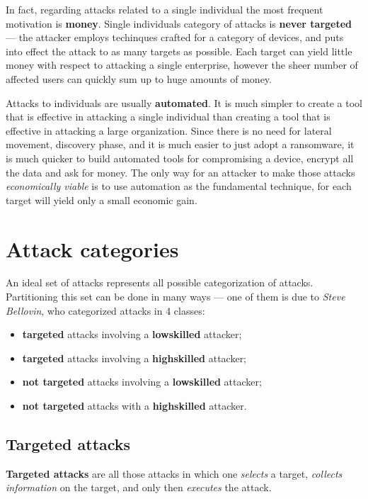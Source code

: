 \documentclass[10pt]{extreport}
\begin{document}
In fact, regarding attacks related to a single individual the most frequent
motivation is \textbf{money}. Single individuals category of attacks is
\textbf{never targeted} --- the attacker employs techinques crafted for a category
of devices, and puts into effect the attack to as many targets as possible.
Each target can yield little money with respect to attacking a single
enterprise, however the sheer number of affected users can quickly sum up to
huge amounts of money.

Attacks to individuals are usually \textbf{automated}. It is much
simpler to create a tool that is effective in attacking a single individual
than creating a tool that is effective in attacking a large organization. Since
there is no need for lateral movement, discovery phase, and it is much easier
to just adopt a ransomware, it is much quicker to build automated tools for
compromising a device, encrypt all the data and ask for money. The only way for
an attacker to make those attacks \emph{economically viable} is to use
automation as the fundamental technique, for each target will yield only a small
economic gain.

\section{Attack categories}

An ideal set of attacks represents all possible categorization of attacks.
Partitioning this set can be done in many ways --- one of them is due to
\emph{Steve Bellovin}, who categorized attacks in 4 classes:
\begin{itemize}
    \item \textbf{targeted} attacks involving a \textbf{low\textendash{}skilled} attacker;
    \item \textbf{targeted} attacks involving a \textbf{high\textendash{}skilled} attacker;
    \item \textbf{not targeted} attacks involving a \textbf{low\textendash{}skilled} attacker;
    \item \textbf{not targeted} attacks with a \textbf{high\textendash{}skilled} attacker.
\end{itemize}

\subsection{Targeted attacks}

\textbf{Targeted attacks} are all those attacks in which one \emph{selects} a
target, \emph{collects information} on the target, and only then
\emph{executes} the attack.
\end{document}

